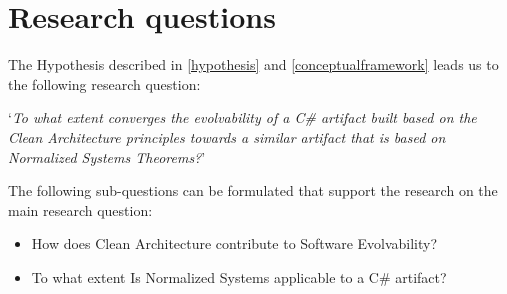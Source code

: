 \section{Research questions} \label{research_questions}
The Hypothesis described in \ref{hypothesis} and \ref{conceptualframework} leads us to the
following research question:

\begin{center}
    \enquote*{\textit{To what extent converges the evolvability of a C\# artifact built
    based on the Clean Architecture principles towards a similar artifact that is based on
    Normalized Systems Theorems?}}
\end{center}

The following sub-questions can be formulated that support the research on the main
research question:
\begin{itemize}
    \item How does Clean Architecture contribute to Software Evolvability?
    \item To what extent Is Normalized Systems applicable to a C\# artifact?   
\end{itemize}